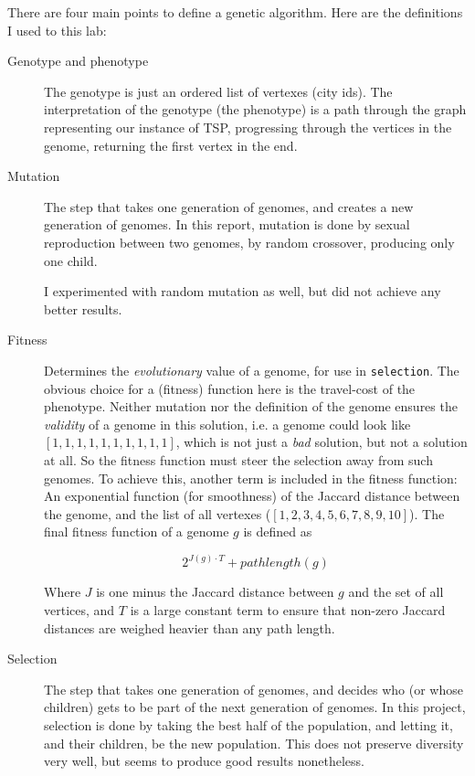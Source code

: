 \documentclass[a4paper, titlepage]{report}
\renewcommand{\%}{\scalebox{.9}{\oldpct}}
\begin{document}
There are four main points to define a genetic algorithm. Here are the
definitions I used to this lab:
\begin{description}
\item[Genotype and phenotype]
The genotype is just an ordered list of vertexes (city ids).
The interpretation of the genotype (the phenotype) is a path through the graph
representing our instance of TSP, progressing through the vertices in the
genome, returning the first vertex in the end.

\item[Mutation]
The step that takes one generation of genomes, and creates a
new generation of genomes. In this report, mutation is done by sexual
reproduction between two genomes, by random crossover, producing only one child.

I experimented with random mutation as well, but did
not achieve any better results.

\item[Fitness]
Determines the \textit{evolutionary} value of a genome, for use in
\texttt{selection}. The obvious choice for a (fitness) function here is the
travel-cost of the phenotype. Neither mutation nor the definition of the genome
ensures the \textit{validity} of a genome in this solution, i.e. a genome could
look like $\left[1,1,1,1,1,1,1,1,1,1\right]$, which is not just a \textit{bad}
solution, but not a solution at all. So the fitness function must steer the
selection away from such genomes. To achieve this, another term is included in
the fitness function: An exponential function (for smoothness) of the Jaccard
distance between the genome, and the list of all vertexes
($\left[1,2,3,4,5,6,7,8,9,10\right]$). 
The final fitness function of a genome $g$ is defined as

	$$2^{J(g) \cdot T} + pathlength(g)$$

Where $J$ is one minus the Jaccard distance between $g$ and the set of all
vertices, and $T$ is a large constant term to ensure that non-zero Jaccard
distances are weighed heavier than any path length.

\item[Selection]
The step that takes one generation of genomes, and decides who (or whose children)
gets to be part of the next generation of genomes.
In this project, selection is done by taking the best half of the population, and
letting it, and their children, be the new population.
This does not preserve diversity very well, but seems to produce good results
nonetheless.
\end{description}
\end{document}
